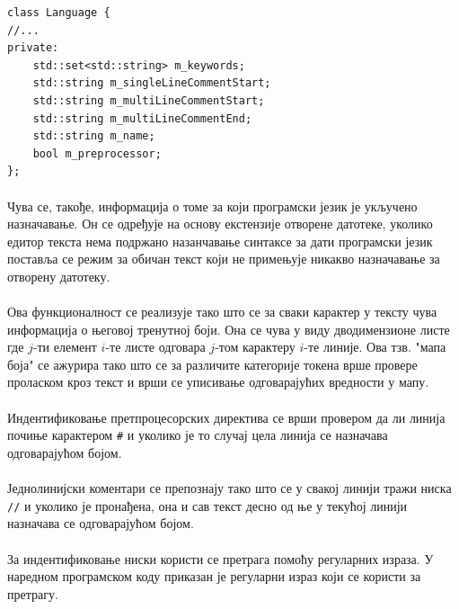 \documentclass[12pt,oneside]{memoir}
\begin{document}
\begin{verbatim}
class Language {
//...
private:
	std::set<std::string> m_keywords;
	std::string m_singleLineCommentStart;
	std::string m_multiLineCommentStart;
	std::string m_multiLineCommentEnd;
	std::string m_name;
	bool m_preprocessor;
};
\end{verbatim}

\paragraph{}
Чува се, такође, информација о томе за који програмски језик је укључено
назначавање. Он се одређује на основу екстензије отворене датотеке, уколико
едитор текста нема подржано назанчавање синтаксе за дати програмски језик
поставља се режим за обичан текст који не примењује никакво назначавање
за отворену датотеку.

\paragraph{}
Ова функционалност се реализује тако што се за сваки карактер у тексту чува
информација о његовој тренутној боји. Она се чува у виду дводимензионе листе где \(j\)-ти елемент \(i\)-те
листе одговара \(j\)-том карактеру \(i\)-те линије. Ова тзв. "мапа боја" се
ажурира тако што се за различите категорије токена врше провере проласком
кроз текст и врши се уписивање одговарајућих вредности у мапу.

\paragraph{}
Индентификовање претпроцесорских директива се врши провером да ли линија почиње карактером \verb|#| и уколико је то случај цела линија се назначава одговарајућом бојом.

\paragraph{}
Једнолинијски коментари се препознају тако што се у свакој линији тражи ниска \verb|//| и уколико је пронађена, она и сав текст десно од ње у текућој линији назначава се одговарајућом бојом.

\paragraph{}
За индентификовање ниски користи се претрага помоћу регуларних израза. У наредном програмском коду приказан је регуларни израз који се користи за
претрагу.
\end{document}
